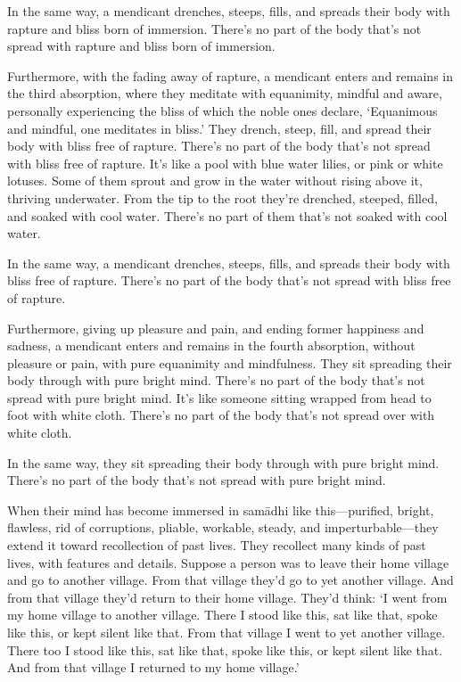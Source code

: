 \documentclass[12pt,openany]{book}%
\begin{document}
In the same way, a mendicant drenches, steeps, fills, and spreads their body with rapture and bliss born of immersion. There’s no part of the body that’s not spread with rapture and bliss born of immersion. 

Furthermore, with the fading away of rapture, a mendicant enters and remains in the third absorption, where they meditate with equanimity, mindful and aware, personally experiencing the bliss of which the noble ones declare, ‘Equanimous and mindful, one meditates in bliss.’ They drench, steep, fill, and spread their body with bliss free of rapture. There’s no part of the body that’s not spread with bliss free of rapture. It’s like a pool with blue water lilies, or pink or white lotuses. Some of them sprout and grow in the water without rising above it, thriving underwater. From the tip to the root they’re drenched, steeped, filled, and soaked with cool water. There’s no part of them that’s not soaked with cool water. 

In the same way, a mendicant drenches, steeps, fills, and spreads their body with bliss free of rapture. There’s no part of the body that’s not spread with bliss free of rapture. 

Furthermore, giving up pleasure and pain, and ending former happiness and sadness, a mendicant enters and remains in the fourth absorption, without pleasure or pain, with pure equanimity and mindfulness. They sit spreading their body through with pure bright mind. There’s no part of the body that’s not spread with pure bright mind. It’s like someone sitting wrapped from head to foot with white cloth. There’s no part of the body that’s not spread over with white cloth. 

In the same way, they sit spreading their body through with pure bright mind. There’s no part of the body that’s not spread with pure bright mind. 

When their mind has become immersed in \textsanskrit{samādhi} like this—purified, bright, flawless, rid of corruptions, pliable, workable, steady, and imperturbable—they extend it toward recollection of past lives. They recollect many kinds of past lives, with features and details. Suppose a person was to leave their home village and go to another village. From that village they’d go to yet another village. And from that village they’d return to their home village. They’d think: ‘I went from my home village to another village. There I stood like this, sat like that, spoke like this, or kept silent like that. From that village I went to yet another village. There too I stood like this, sat like that, spoke like this, or kept silent like that. And from that village I returned to my home village.’ 
\end{document}

